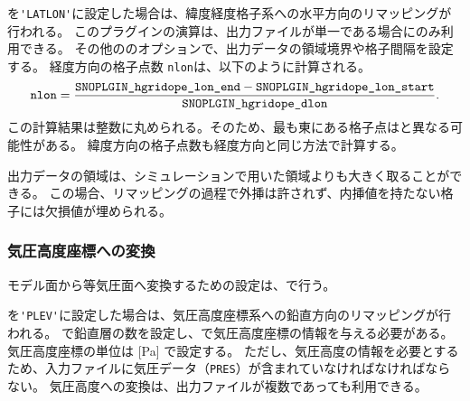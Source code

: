 を\verb|'LATLON'|に設定した場合は、緯度経度格子系への水平方向のリマッピングが行われる。
このプラグインの演算は、出力ファイルが単一である場合にのみ利用できる。
その他ののオプションで、出力データの領域境界や格子間隔を設定する。
経度方向の格子点数 \verb|nlon|は、以下のように計算される。
\begin{eqnarray}
  \nmitemeq{nlon} = \frac{\nmitemeq{SNOPLGIN_hgridope_lon_end} - \nmitemeq{SNOPLGIN_hgridope_lon_start} }{\nmitemeq{SNOPLGIN_hgridope_dlon}} \nonumber.
\end{eqnarray}
\noindent
この計算結果は整数に丸められる。そのため、最も東にある格子点はと異なる可能性がある。
緯度方向の格子点数も経度方向と同じ方法で計算する。

出力データの領域は、シミュレーションで用いた領域よりも大きく取ることができる。
この場合、リマッピングの過程で外挿は許されず、内挿値を持たない格子には欠損値が埋められる。


\subsubsection{気圧高度座標への変換}

モデル面から等気圧面へ変換するための設定は、で行う。
%

を\verb|'PLEV'|に設定した場合は、気圧高度座標系への鉛直方向のリマッピングが行われる。
で鉛直層の数を設定し、で気圧高度座標の情報を与える必要がある。
気圧高度座標の単位は [Pa] で設定する。
ただし、気圧高度の情報を必要とするため、入力ファイルに気圧データ（\verb|PRES|）が含まれていなければなければならない。
気圧高度への変換は、出力ファイルが複数であっても利用できる。
